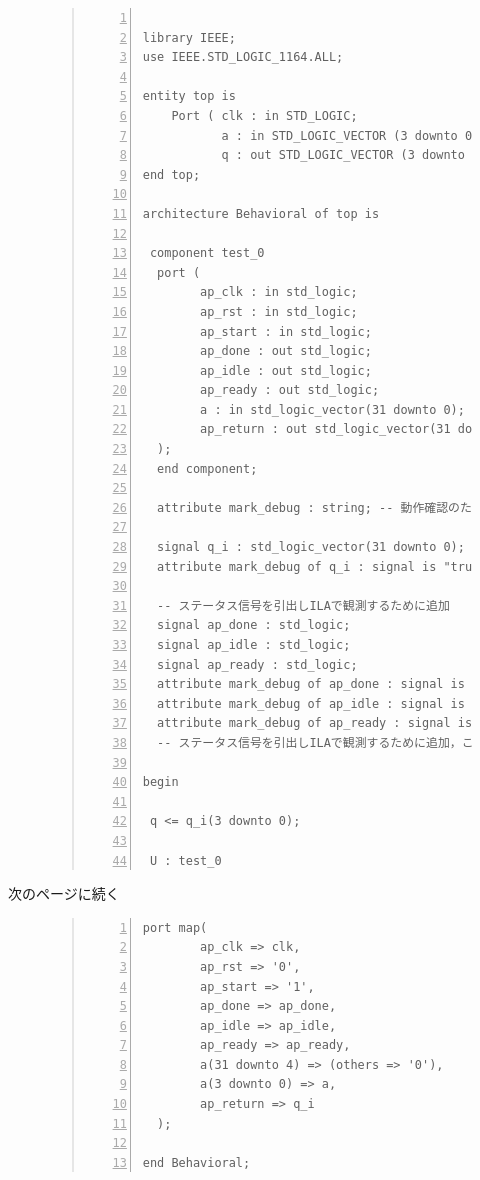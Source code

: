\documentclass[a4paper,dvipdfmx]{jsarticle}
\begin{document}
\begin{figure}[H]
\begin{quote}
\begin{Verbatim}[frame=single, numbers=left, baselinestretch=0.8]

library IEEE;
use IEEE.STD_LOGIC_1164.ALL;

entity top is
    Port ( clk : in STD_LOGIC;
           a : in STD_LOGIC_VECTOR (3 downto 0);
           q : out STD_LOGIC_VECTOR (3 downto 0));
end top;

architecture Behavioral of top is

 component test_0
  port (
        ap_clk : in std_logic;
        ap_rst : in std_logic;
        ap_start : in std_logic;
        ap_done : out std_logic;
        ap_idle : out std_logic;
        ap_ready : out std_logic;
        a : in std_logic_vector(31 downto 0);
        ap_return : out std_logic_vector(31 downto 0)
  );
  end component;
  
  attribute mark_debug : string; -- 動作確認のためにmark_debugアトリビュートを使う
  
  signal q_i : std_logic_vector(31 downto 0);
  attribute mark_debug of q_i : signal is "true"; -- mark_debugに指定
  
  -- ステータス信号を引出しILAで観測するために追加
  signal ap_done : std_logic;  
  signal ap_idle : std_logic;
  signal ap_ready : std_logic;
  attribute mark_debug of ap_done : signal is "true";
  attribute mark_debug of ap_idle : signal is "true";
  attribute mark_debug of ap_ready : signal is "true";
  -- ステータス信号を引出しILAで観測するために追加，ここまで
  
begin

 q <= q_i(3 downto 0);

 U : test_0
  \end{Verbatim}
 \end{quote}
\end{figure}
次のページに続く
\begin{figure}[H]
\begin{quote}
\begin{Verbatim}[frame=single, numbers=left, baselinestretch=0.8]
  port map(
        ap_clk => clk,
        ap_rst => '0',
        ap_start => '1',
        ap_done => ap_done,
        ap_idle => ap_idle,
        ap_ready => ap_ready,
        a(31 downto 4) => (others => '0'),
        a(3 downto 0) => a,
        ap_return => q_i
  );

end Behavioral;
  \end{Verbatim}
 \end{quote}
\end{figure}
\end{document}
